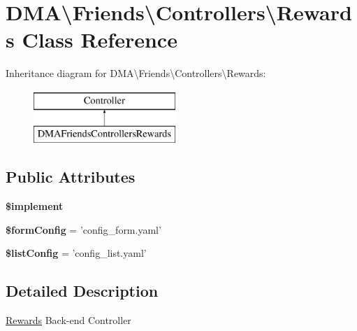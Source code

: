 \hypertarget{classDMA_1_1Friends_1_1Controllers_1_1Rewards}{\section{D\+M\+A\textbackslash{}Friends\textbackslash{}Controllers\textbackslash{}Rewards Class Reference}
\label{classDMA_1_1Friends_1_1Controllers_1_1Rewards}
}
Inheritance diagram for D\+M\+A\textbackslash{}Friends\textbackslash{}Controllers\textbackslash{}Rewards\+:\begin{figure}[H]
\begin{center}
\leavevmode
\includegraphics[height=2.000000cm]{d2/dab/classDMA_1_1Friends_1_1Controllers_1_1Rewards}
\end{center}
\end{figure}
\subsection*{Public Attributes}
\begin{DoxyCompactItemize}
\item 
{\bfseries \$implement}
\item 
\hypertarget{classDMA_1_1Friends_1_1Controllers_1_1Rewards_a9522421e338fbc2e218588583b5fb9a7}{{\bfseries \$form\+Config} = 'config\+\_\+form.\+yaml'}\label{classDMA_1_1Friends_1_1Controllers_1_1Rewards_a9522421e338fbc2e218588583b5fb9a7}

\item 
\hypertarget{classDMA_1_1Friends_1_1Controllers_1_1Rewards_a887be4eff98a60ac76c7c06e4513430a}{{\bfseries \$list\+Config} = 'config\+\_\+list.\+yaml'}\label{classDMA_1_1Friends_1_1Controllers_1_1Rewards_a887be4eff98a60ac76c7c06e4513430a}

\end{DoxyCompactItemize}


\subsection{Detailed Description}
\hyperlink{classDMA_1_1Friends_1_1Controllers_1_1Rewards}{Rewards} Back-\/end Controller 

